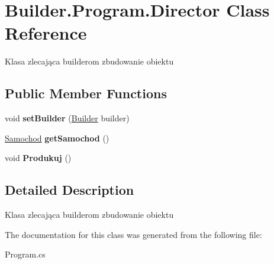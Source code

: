 \hypertarget{class_builder_1_1_program_1_1_director}{}\section{Builder.\+Program.\+Director Class Reference}
\label{class_builder_1_1_program_1_1_director}


Klasa zlecająca builderom zbudowanie obiektu  


\subsection*{Public Member Functions}
\begin{DoxyCompactItemize}
\item 
\mbox{\label{class_builder_1_1_program_1_1_director_a5fb8365b0b81938e4364d01f8d61b696}} 
void {\bfseries set\+Builder} (\hyperlink{class_builder_1_1_program_1_1_builder}{Builder} builder)
\item 
\mbox{\label{class_builder_1_1_program_1_1_director_ab055442d8b92dda823881f4d5d062c39}} 
\hyperlink{class_builder_1_1_program_1_1_samochod}{Samochod} {\bfseries get\+Samochod} ()
\item 
\mbox{\label{class_builder_1_1_program_1_1_director_a5426a035af6a76cc18b2dd15a450df55}} 
void {\bfseries Produkuj} ()
\end{DoxyCompactItemize}


\subsection{Detailed Description}
Klasa zlecająca builderom zbudowanie obiektu 



The documentation for this class was generated from the following file\+:\begin{DoxyCompactItemize}
\item 
Program.\+cs\end{DoxyCompactItemize}
